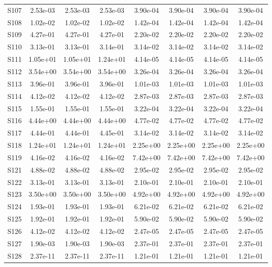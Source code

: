 {\begin{longtable}{l S[table-format=1.2e+2] S[table-format=1.2e+2] S[table-format=1.2e+2] S[table-format=1.2e+2] S[table-format=1.2e+2] S[table-format=1.2e+2] S[table-format=1.2e+2]}
S107 & 2.53e-03 & 2.53e-03 & 2.53e-03 & 3.90e-04 & 3.90e-04 & 3.90e-04 & 3.90e-04 \\
S108 & 1.02e-02 & 1.02e-02 & 1.02e-02 & 1.42e-04 & 1.42e-04 & 1.42e-04 & 1.42e-04 \\
S109 & 4.27e-01 & 4.27e-01 & 4.27e-01 & 2.20e-02 & 2.20e-02 & 2.20e-02 & 2.20e-02 \\
S110 & 3.13e-01 & 3.13e-01 & 3.14e-01 & 3.14e-02 & 3.14e-02 & 3.14e-02 & 3.14e-02 \\
S111 & 1.05e+01 & 1.05e+01 & 1.24e+01 & 4.14e-05 & 4.14e-05 & 4.14e-05 & 4.14e-05 \\
S112 & 3.54e+00 & 3.54e+00 & 3.54e+00 & 3.26e-04 & 3.26e-04 & 3.26e-04 & 3.26e-04 \\
S113 & 3.96e-01 & 3.96e-01 & 3.96e-01 & 1.01e-03 & 1.01e-03 & 1.01e-03 & 1.01e-03 \\
S114 & 4.12e-02 & 4.12e-02 & 4.12e-02 & 2.87e-03 & 2.87e-03 & 2.87e-03 & 2.87e-03 \\
S115 & 1.55e-01 & 1.55e-01 & 1.55e-01 & 3.22e-04 & 3.22e-04 & 3.22e-04 & 3.22e-04 \\
S116 & 4.44e+00 & 4.44e+00 & 4.44e+00 & 4.77e-02 & 4.77e-02 & 4.77e-02 & 4.77e-02 \\
S117 & 4.44e-01 & 4.44e-01 & 4.45e-01 & 3.14e-02 & 3.14e-02 & 3.14e-02 & 3.14e-02 \\
S118 & 1.24e+01 & 1.24e+01 & 1.24e+01 & 2.25e+00 & 2.25e+00 & 2.25e+00 & 2.25e+00 \\
S119 & 4.16e-02 & 4.16e-02 & 4.16e-02 & 7.42e+00 & 7.42e+00 & 7.42e+00 & 7.42e+00 \\
S121 & 4.88e-02 & 4.88e-02 & 4.88e-02 & 2.95e-02 & 2.95e-02 & 2.95e-02 & 2.95e-02 \\
S122 & 3.13e-01 & 3.13e-01 & 3.13e-01 & 2.10e-01 & 2.10e-01 & 2.10e-01 & 2.10e-01 \\
S123 & 3.50e+00 & 3.50e+00 & 3.50e+00 & 4.92e+00 & 4.92e+00 & 4.92e+00 & 4.92e+00 \\
S124 & 1.93e-01 & 1.93e-01 & 1.93e-01 & 6.21e-02 & 6.21e-02 & 6.21e-02 & 6.21e-02 \\
S125 & 1.92e-01 & 1.92e-01 & 1.92e-01 & 5.90e-02 & 5.90e-02 & 5.90e-02 & 5.90e-02 \\
S126 & 4.12e-02 & 4.12e-02 & 4.12e-02 & 2.47e-05 & 2.47e-05 & 2.47e-05 & 2.47e-05 \\
S127 & 1.90e-03 & 1.90e-03 & 1.90e-03 & 2.37e-01 & 2.37e-01 & 2.37e-01 & 2.37e-01 \\
S128 & 2.37e-11 & 2.37e-11 & 2.37e-11 & 1.21e-01 & 1.21e-01 & 1.21e-01 & 1.21e-01 \\

\end{longtable}}

